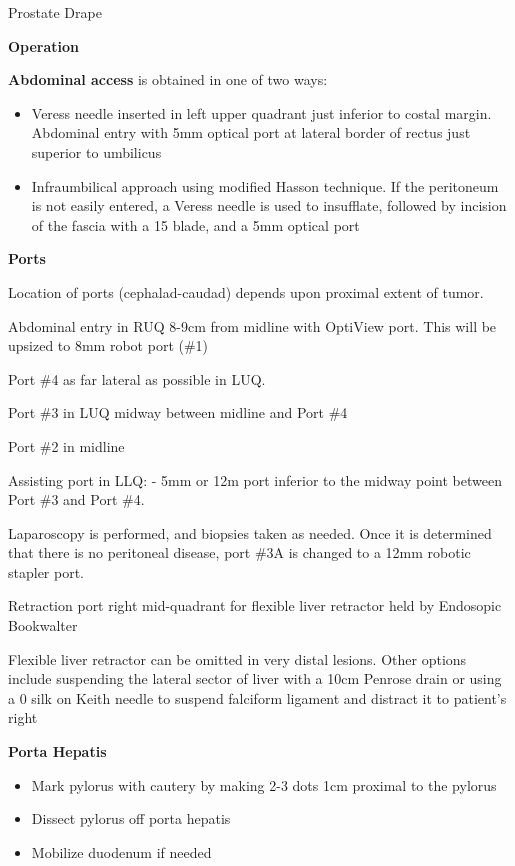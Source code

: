 \documentclass[
  letterpaper,
]{scrbook}
\providecommand{\tightlist}{%
  \setlength{\itemsep}{0pt}\setlength{\parskip}{0pt}}
\begin{document}
Prostate Drape

\textbf{Operation}

\textbf{Abdominal access} is obtained in one of two ways:

\begin{itemize}
\tightlist
\item
  Veress needle inserted in left upper quadrant just inferior to costal
  margin. Abdominal entry with 5mm optical port at lateral border of
  rectus just superior to umbilicus
\item
  Infraumbilical approach using modified Hasson technique. If the
  peritoneum is not easily entered, a Veress needle is used to
  insufflate, followed by incision of the fascia with a 15 blade, and a
  5mm optical port
\end{itemize}

\textbf{Ports}

Location of ports (cephalad-caudad) depends upon proximal extent of
tumor.

Abdominal entry in RUQ 8-9cm from midline with OptiView port. This will
be upsized to 8mm robot port (\#1)

Port \#4 as far lateral as possible in LUQ.

Port \#3 in LUQ midway between midline and Port \#4

Port \#2 in midline

Assisting port in LLQ: - 5mm or 12m port inferior to the midway point
between Port \#3 and Port \#4.

Laparoscopy is performed, and biopsies taken as needed. Once it is
determined that there is no peritoneal disease, port \#3A is changed to
a 12mm robotic stapler port.

Retraction port right mid-quadrant for flexible liver retractor held by
Endosopic Bookwalter

Flexible liver retractor can be omitted in very distal lesions. Other
options include suspending the lateral sector of liver with a 10cm
Penrose drain or using a 0 silk on Keith needle to suspend falciform
ligament and distract it to patient's right

\textbf{Porta Hepatis}

\begin{itemize}
\tightlist
\item
  Mark pylorus with cautery by making 2-3 dots 1cm proximal to the
  pylorus
\item
  Dissect pylorus off porta hepatis
\item
  Mobilize duodenum if needed
\end{itemize}
\end{document}

